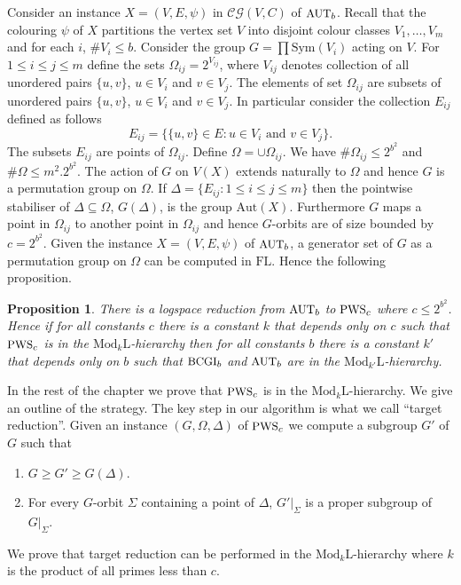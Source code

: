 \documentclass[11pt]{madras}%
\newtheorem{proposition}[theorem]{Proposition}
\theoremstyle{remark}
\newcommand{\Aut}[1]{{\ensuremath{\mathrm{Aut}\left(#1\right)}}}
\newcommand{\Sym}[1]{{\ensuremath{\mathrm{Sym}\left(#1\right)}}}
\newcommand{\ModkL}[1]{{\ensuremath{\mathrm{Mod}_{#1}\mathrm{L}}}}
\newcommand{\ProblemFont}[1]{{\ensuremath{\textrm{\small #1}}}}
\newcommand{\pr}[2]{{\ensuremath{\left.{#1}\right\vert_{#2}}}}
\newcommand{\pointwise}[2]{{\ensuremath{#1\left(#2\right)}}}
\begin{document}
Consider an instance $X = (V,E,\psi)$ in $\mathcal{CG}(V,C)$ of
$\ProblemFont{AUT}_b$. Recall that the colouring $\psi$ of $X$
partitions the vertex set $V$ into disjoint colour classes
$V_1,\ldots,V_m$ and for each $i$, $\# V_i \leq b$.  Consider the
group $G = \prod \Sym{V_i}$ acting on $V$. For $1 \leq i \leq j \leq
m$ define the sets $\Omega_{ij} = 2^{V_{ij}}$, where $V_{ij}$ denotes
collection of all unordered pairs $\{ u , v\}$, $u \in V_i$ and $v \in
V_j$. The elements of set $\Omega_{ij}$ are subsets of unordered pairs
$\{ u,v\}$, $u \in V_i$ and $v \in V_j$. In particular consider the
collection $E_{ij}$ defined as follows
\[
E_{ij} = \{ \{ u,v\} \in E : u \in V_i\textrm{ and }v \in V_j \}.
\]
The subsets $E_{ij}$ are points of $\Omega_{ij}$.  Define $\Omega =
\cup \Omega_{ij}$. We have $\# \Omega_{ij} \leq 2^{b^2}$ and $\#
\Omega \leq m^2 .  2^{b^2}$.  The action of $G$ on $V(X)$ extends
naturally to $\Omega$ and hence $G$ is a permutation group on
$\Omega$. If $\Delta = \{ E_{ij} : 1 \leq i \leq j \leq m \}$ then the
pointwise stabiliser of $\Delta \subseteq \Omega$,
$\pointwise{G}{\Delta}$, is the group $\Aut{X}$.  Furthermore $G$ maps
a point in $\Omega_{ij}$ to another point in $\Omega_{ij}$ and hence
$G$-orbits are of size bounded by $c = 2^{b^2}$. Given the instance $X
= (V,E,\psi)$ of $\ProblemFont{AUT}_b$, a generator set of $G$ as a
permutation group on $\Omega$ can be computed in $\mathrm{FL}$.  Hence
the following proposition.

\begin{proposition}\label{prop-red-aut-pws}
  There is a logspace reduction from $\ProblemFont{AUT}_b$ to
  $\ProblemFont{PWS}_c$ where $c \leq 2^{b^2}$. Hence if for all
  constants $c$ there is a constant $k$ that depends only on $c$ such
  that $\ProblemFont{PWS}_c$ is in the $\ModkL{k}$-hierarchy then for
  all constants $b$ there is a constant $k'$ that depends only on $b$
  such that $\ProblemFont{BCGI}_b$ and $\ProblemFont{AUT}_b$ are in
  the $\ModkL{k'}$-hierarchy.
\end{proposition}
  
In the rest of the chapter we prove that $\ProblemFont{PWS}_c$ is in
the $\ModkL{k}$-hierarchy. We give an outline of the strategy.  The
key step in our algorithm is what we call ``target reduction''.  Given
an instance $(G,\Omega,\Delta)$ of $\ProblemFont{PWS}_c$ we compute a
subgroup $G'$ of $G$ such that
\begin{enumerate}
\item $G \geq G' \geq \pointwise{G}{\Delta}$.
\item For every $G$-orbit $\Sigma$ containing a point of $\Delta$,
  $\pr{G'}{\Sigma}$ is a proper subgroup of $\pr{G}{\Sigma}$.
\end{enumerate}
We prove that target reduction can be performed in the
$\ModkL{k}$-hierarchy where $k$ is the product of all primes less than
$c$.
\end{document}
